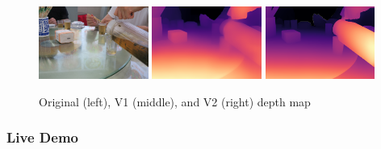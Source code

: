 \documentclass[12pt]{beamer}
\begin{document}
\begin{frame}
\begin{figure}
        \includegraphics[width=0.32\textwidth]{./figures/tea.JPG}
        \includegraphics[width=0.32\textwidth]{./figures/tea_v1-small.png}
        \includegraphics[width=0.32\textwidth]{./figures/tea_v2-small.png}
        \caption{Original (left), V1 (middle), and V2 (right) depth map}
        \label{fig:res_2}
    \end{figure}
\end{frame}

\begin{frame}
    \frametitle{Live Demo}
    
\end{frame}
\end{document}
